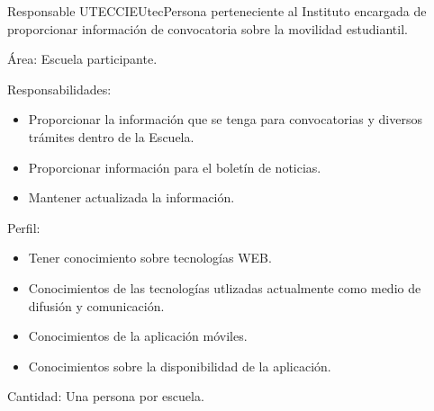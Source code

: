 \begin{actor}{Responsable UTEC}{CIEUtec}{Persona perteneciente al Instituto encargada de proporcionar información de convocatoria sobre la movilidad estudiantil.}
	
	\item[Área:] Escuela participante.
	\item[Responsabilidades:] \hspace{1pt}
	
	\begin{itemize}
		
		\item Proporcionar la información que se tenga para convocatorias y diversos trámites dentro de la Escuela.
		\item Proporcionar información para el boletín de noticias.
		\item Mantener actualizada la información.

		
	\end{itemize}
	
	\item[Perfil:] \hspace{1pt}
	
	\begin{itemize}
		
		\item Tener conocimiento sobre tecnologías WEB.
		\item Conocimientos de las tecnologías utlizadas actualmente como medio de difusión y comunicación.
		\item Conocimientos de la aplicación móviles.
		\item Conocimientos sobre la disponibilidad de la aplicación.	
	\end{itemize}
	
	\item[Cantidad:] Una persona por escuela.
	
\end{actor}


